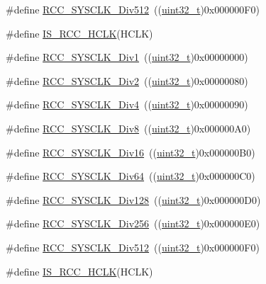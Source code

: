 \begin{DoxyCompactItemize}
\item 
\#define \hyperlink{group___a_h_b__clock__source_gab5b4588c455d6327bc96f131ed6698ab}{R\+C\+C\+\_\+\+S\+Y\+S\+C\+L\+K\+\_\+\+Div512}~((\hyperlink{_p_e___types_8h_a33594304e786b158f3fb30289278f5af}{uint32\+\_\+t})0x000000\+F0)
\item 
\#define \hyperlink{group___a_h_b__clock__source_ga6e9f1c193a2f41bcb3c2f7fa8459b5b3}{I\+S\+\_\+\+R\+C\+C\+\_\+\+H\+C\+LK}(H\+C\+LK)
\item 
\#define \hyperlink{group___a_h_b__clock__source_gadc3ac37d90c2082d640e5948fac0878f}{R\+C\+C\+\_\+\+S\+Y\+S\+C\+L\+K\+\_\+\+Div1}~((\hyperlink{_p_e___types_8h_a33594304e786b158f3fb30289278f5af}{uint32\+\_\+t})0x00000000)
\item 
\#define \hyperlink{group___a_h_b__clock__source_gacadd82156776154a07d128b454fc69fd}{R\+C\+C\+\_\+\+S\+Y\+S\+C\+L\+K\+\_\+\+Div2}~((\hyperlink{_p_e___types_8h_a33594304e786b158f3fb30289278f5af}{uint32\+\_\+t})0x00000080)
\item 
\#define \hyperlink{group___a_h_b__clock__source_ga458f8ae63164e878930dbebd7643f087}{R\+C\+C\+\_\+\+S\+Y\+S\+C\+L\+K\+\_\+\+Div4}~((\hyperlink{_p_e___types_8h_a33594304e786b158f3fb30289278f5af}{uint32\+\_\+t})0x00000090)
\item 
\#define \hyperlink{group___a_h_b__clock__source_gade72fe3aca89f3e8c4fe8692ea217912}{R\+C\+C\+\_\+\+S\+Y\+S\+C\+L\+K\+\_\+\+Div8}~((\hyperlink{_p_e___types_8h_a33594304e786b158f3fb30289278f5af}{uint32\+\_\+t})0x000000\+A0)
\item 
\#define \hyperlink{group___a_h_b__clock__source_gaefd8df4be9c9dbd9cebfb2384933500a}{R\+C\+C\+\_\+\+S\+Y\+S\+C\+L\+K\+\_\+\+Div16}~((\hyperlink{_p_e___types_8h_a33594304e786b158f3fb30289278f5af}{uint32\+\_\+t})0x000000\+B0)
\item 
\#define \hyperlink{group___a_h_b__clock__source_gab6a2c2d4e945c607259988a9b6df26e5}{R\+C\+C\+\_\+\+S\+Y\+S\+C\+L\+K\+\_\+\+Div64}~((\hyperlink{_p_e___types_8h_a33594304e786b158f3fb30289278f5af}{uint32\+\_\+t})0x000000\+C0)
\item 
\#define \hyperlink{group___a_h_b__clock__source_ga1a28926fcb86112058a365e01fe9a46b}{R\+C\+C\+\_\+\+S\+Y\+S\+C\+L\+K\+\_\+\+Div128}~((\hyperlink{_p_e___types_8h_a33594304e786b158f3fb30289278f5af}{uint32\+\_\+t})0x000000\+D0)
\item 
\#define \hyperlink{group___a_h_b__clock__source_gaa28bb876893b3267a813fc98a462d5ee}{R\+C\+C\+\_\+\+S\+Y\+S\+C\+L\+K\+\_\+\+Div256}~((\hyperlink{_p_e___types_8h_a33594304e786b158f3fb30289278f5af}{uint32\+\_\+t})0x000000\+E0)
\item 
\#define \hyperlink{group___a_h_b__clock__source_gab5b4588c455d6327bc96f131ed6698ab}{R\+C\+C\+\_\+\+S\+Y\+S\+C\+L\+K\+\_\+\+Div512}~((\hyperlink{_p_e___types_8h_a33594304e786b158f3fb30289278f5af}{uint32\+\_\+t})0x000000\+F0)
\item 
\#define \hyperlink{group___a_h_b__clock__source_ga6e9f1c193a2f41bcb3c2f7fa8459b5b3}{I\+S\+\_\+\+R\+C\+C\+\_\+\+H\+C\+LK}(H\+C\+LK)
\end{DoxyCompactItemize}


